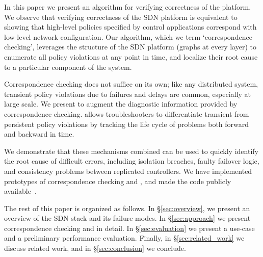 In this paper we present an algorithm for verifying correctness of the
platform. We observe that verifying correctness of the SDN platform
is equivalent to showing that high-level policies specified by
control applications correspond with low-level network configuration.
Our algorithm, which we term `correspondence checking',
leverages the structure of the SDN platform (graphs at every layer)
to enumerate all policy violations at any point in time, and localize their
root cause to a particular component of the system.

Correspondence checking does not suffice on its own; like any distributed
system, transient policy violations due to failures and delays are
common, especially at large scale. We present \simulator{}
to augment the diagnostic information provided by correspondence checking.
\Simulator{} allows troubleshooters
to differentiate transient from persistent policy violations by tracking the life cycle of problems
both forward and backward in time.

We demonstrate that these mechanisms combined can be used to quickly
identify the root cause of difficult errors, including isolation breaches,
faulty failover logic, and consistency problems between replicated
controllers. We have implemented prototypes
of correspondence checking and \simulator{}, and made the code publicly
available~\cite{github}.

The rest of this paper is organized as follows. In \S\ref{sec:overview},
we present an overview of the SDN stack and its failure modes.
In \S\ref{sec:approach} we present correspondence checking and
\simulator{} in detail. In \S\ref{sec:evaluation} we present
a use-case and a preliminary performance evaluation.
Finally, in \S\ref{sec:related_work} we discuss related work,
and in \S\ref{sec:conclusion} we conclude.
